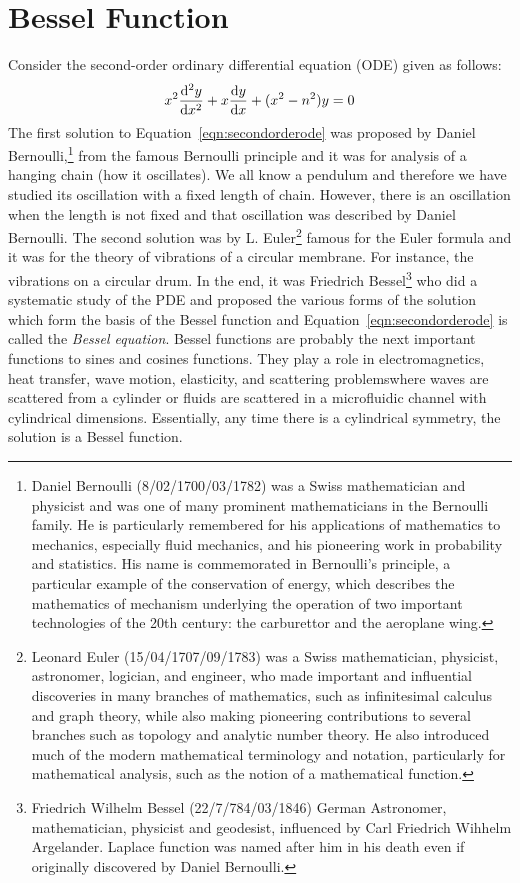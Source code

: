 \section{Bessel Function}
Consider the second-order ordinary differential equation (ODE) given as follows:
\begin{align}
x^2 \derivative[2]{y}{x} + x \derivative{y}{x} + (x^2 - n^2)y = 0
\label{eqn:secondorderode}
\end{align}
The first solution to Equation~\eqref{eqn:secondorderode} was proposed by Daniel Bernoulli,\footnote{
Daniel Bernoulli (8/02/1700/03/1782) was a Swiss mathematician and physicist and was one of many prominent mathematicians in the Bernoulli family. He is particularly remembered for his applications of mathematics to mechanics, especially fluid mechanics, and his pioneering work in probability and statistics. His name is commemorated in Bernoulli's principle, a particular example of the conservation of energy, which describes the mathematics of mechanism underlying the operation of two important technologies of the 20th century: the carburettor and the aeroplane wing.
}
from the famous Bernoulli principle and it was for analysis of a hanging chain (how it oscillates). We all know a pendulum and therefore we have studied its oscillation with a fixed length of chain. However, there is an oscillation when the length is not fixed and that oscillation was described by Daniel Bernoulli. The second solution was by L. Euler\footnote{
Leonard Euler (15/04/1707/09/1783) was a Swiss mathematician, physicist, astronomer, logician, and engineer, who made important and influential discoveries in many branches of mathematics, such as infinitesimal calculus and graph theory, while also making pioneering contributions to several branches such as topology and analytic number theory. He also introduced much of the modern mathematical terminology and notation, particularly for mathematical analysis, such as the notion of a mathematical function.
} famous for the Euler formula and it was for the theory of vibrations of a circular membrane. For instance, the vibrations on a circular drum. In the end, it was Friedrich Bessel\footnote{
Friedrich Wilhelm Bessel (22/7/784/03/1846) German Astronomer, mathematician, physicist and geodesist, influenced by Carl Friedrich Wihhelm Argelander. Laplace function was named after him in his death even if originally discovered by Daniel Bernoulli.
} who did a systematic study of the PDE and proposed the various forms of the solution which form the basis of the Bessel function and Equation~\eqref{eqn:secondorderode} is called the \emph{Bessel equation}. Bessel functions are probably the next important functions to sines and cosines functions. They play a role in electromagnetics, heat transfer, wave motion, elasticity, and scattering problems\textemdash where waves are scattered from a cylinder or fluids are scattered in a microfluidic channel with cylindrical dimensions. Essentially, any time there is a cylindrical symmetry, the solution is a Bessel function.

